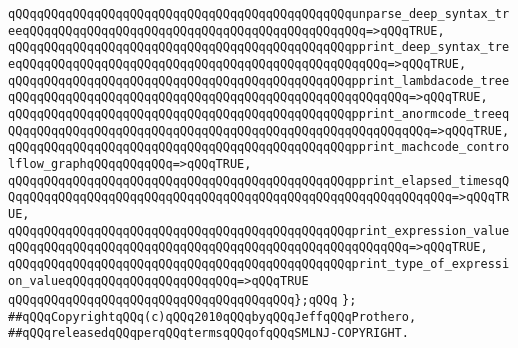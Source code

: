 \verb|qQQqqQQqqQQqqQQqqQQqqQQqqQQqqQQqqQQqqQQqqQQqqQQqunparse_deep_syntax_treeqQQqqQQqqQQqqQQqqQQqqQQqqQQqqQQqqQQqqQQqqQQqqQQq=>qQQqTRUE,|\newline
\verb|qQQqqQQqqQQqqQQqqQQqqQQqqQQqqQQqqQQqqQQqqQQqqQQqpprint_deep_syntax_treeqQQqqQQqqQQqqQQqqQQqqQQqqQQqqQQqqQQqqQQqqQQqqQQqqQQq=>qQQqTRUE,|\newline
\verb|qQQqqQQqqQQqqQQqqQQqqQQqqQQqqQQqqQQqqQQqqQQqqQQqpprint_lambdacode_treeqQQqqQQqqQQqqQQqqQQqqQQqqQQqqQQqqQQqqQQqqQQqqQQqqQQqqQQq=>qQQqTRUE,|\newline
\verb|qQQqqQQqqQQqqQQqqQQqqQQqqQQqqQQqqQQqqQQqqQQqqQQqpprint_anormcode_treeqQQqqQQqqQQqqQQqqQQqqQQqqQQqqQQqqQQqqQQqqQQqqQQqqQQqqQQqqQQq=>qQQqTRUE,|\newline
\verb|qQQqqQQqqQQqqQQqqQQqqQQqqQQqqQQqqQQqqQQqqQQqqQQqpprint_machcode_controlflow_graphqQQqqQQqqQQq=>qQQqTRUE,|\newline
\verb|qQQqqQQqqQQqqQQqqQQqqQQqqQQqqQQqqQQqqQQqqQQqqQQqpprint_elapsed_timesqQQqqQQqqQQqqQQqqQQqqQQqqQQqqQQqqQQqqQQqqQQqqQQqqQQqqQQqqQQqqQQq=>qQQqTRUE,|\newline
\verb|qQQqqQQqqQQqqQQqqQQqqQQqqQQqqQQqqQQqqQQqqQQqqQQqprint_expression_valueqQQqqQQqqQQqqQQqqQQqqQQqqQQqqQQqqQQqqQQqqQQqqQQqqQQqqQQq=>qQQqTRUE,|\newline
\verb|qQQqqQQqqQQqqQQqqQQqqQQqqQQqqQQqqQQqqQQqqQQqqQQqprint_type_of_expression_valueqQQqqQQqqQQqqQQqqQQqqQQq=>qQQqTRUE|\newline
\verb|qQQqqQQqqQQqqQQqqQQqqQQqqQQqqQQqqQQqqQQq};qQQq|\newline
\verb|};|\newline
\newline
\newline
\verb|##qQQqCopyrightqQQq(c)qQQq2010qQQqbyqQQqJeffqQQqProthero,|\newline
\verb|##qQQqreleasedqQQqperqQQqtermsqQQqofqQQqSMLNJ-COPYRIGHT.|\newline

